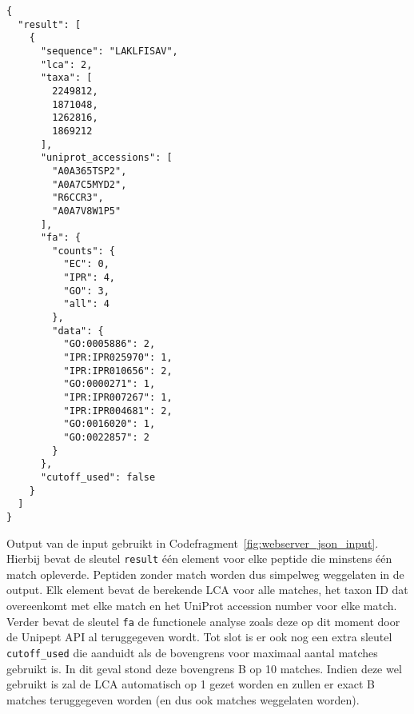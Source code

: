 \begin{listing}[h!]
    \begin{verbatim}
{
  "result": [
    {
      "sequence": "LAKLFISAV",
      "lca": 2,
      "taxa": [
        2249812,
        1871048,
        1262816,
        1869212
      ],
      "uniprot_accessions": [
        "A0A365TSP2",
        "A0A7C5MYD2",
        "R6CCR3",
        "A0A7V8W1P5"
      ],
      "fa": {
        "counts": {
          "EC": 0,
          "IPR": 4,
          "GO": 3,
          "all": 4
        },
        "data": {
          "GO:0005886": 2,
          "IPR:IPR025970": 1,
          "IPR:IPR010656": 2,
          "GO:0000271": 1,
          "IPR:IPR007267": 1,
          "IPR:IPR004681": 2,
          "GO:0016020": 1,
          "GO:0022857": 2
        }
      },
      "cutoff_used": false
    }
  ]
}
    \end{verbatim}
    \caption{Output van de input gebruikt in Codefragment~\ref{fig:webserver_json_input}.
    Hierbij bevat de sleutel \texttt{result} één element voor elke peptide die minstens één match opleverde.
    Peptiden zonder match worden dus simpelweg weggelaten in de output.
    Elk element bevat de berekende LCA voor alle matches, het taxon ID dat overeenkomt met elke match en het UniProt accession number voor elke match.
    Verder bevat de sleutel \texttt{fa} de functionele analyse zoals deze op dit moment door de Unipept API al teruggegeven wordt.
    Tot slot is er ook nog een extra sleutel \texttt{cutoff\_used} die aanduidt als de bovengrens voor maximaal aantal matches gebruikt is.
    In dit geval stond deze bovengrens B op 10 matches.
    Indien deze wel gebruikt is zal de LCA automatisch op 1 gezet worden en zullen er exact B matches teruggegeven worden (en dus ook matches weggelaten worden).}
    \label{fig:webserver_json_output}
\end{listing}

